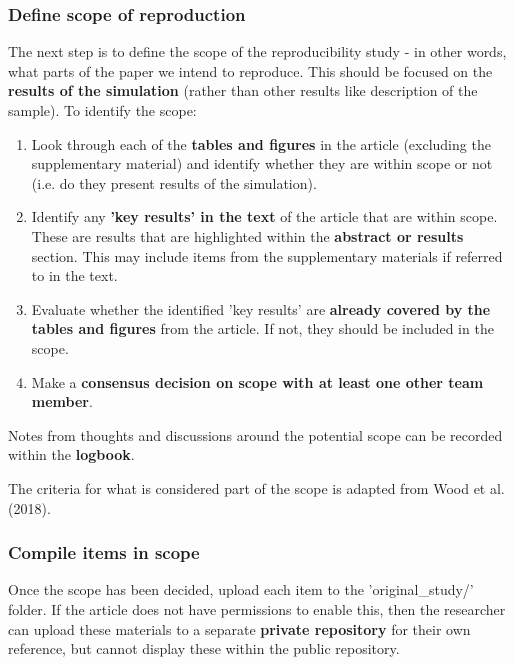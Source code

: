 \vspace{0.5cm}
\subsubsection{Define scope of reproduction}

The next step is to define the scope of the reproducibility study - in other words, what parts of the paper we intend to reproduce. This should be focused on the \textbf{results of the simulation} (rather than other results like description of the sample). To identify the scope:

\begin{enumerate}
    \item Look through each of the \textbf{tables and figures} in the article (excluding the supplementary material) and identify whether they are within scope or not (i.e. do they present results of the simulation).
    \item Identify any \textbf{'key results' in the text} of the article that are within scope. These are results that are highlighted within the \textbf{abstract or results} section. This may include items from the supplementary materials if referred to in the text.
    \item Evaluate whether the identified 'key results' are \textbf{already covered by the tables and figures} from the article. If not, they should be included in the scope.
    \item Make a \textbf{consensus decision on scope with at least one other team member}.
\end{enumerate}

Notes from thoughts and discussions around the potential scope can be recorded within the \textbf{logbook}.

The criteria for what is considered part of the scope is adapted from Wood et al. (2018).\autocite{wood_replication_2018, wood_push_2018}

\vspace{0.5cm}
\subsubsection{Compile items in scope}

Once the scope has been decided, upload each item to the 'original\_study/' folder. If the article does not have permissions to enable this, then the researcher can upload these materials to a separate \textbf{private repository} for their own reference, but cannot display these within the public repository.

